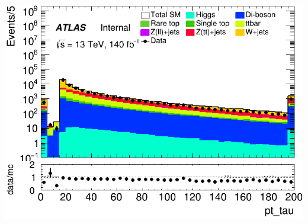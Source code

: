 \documentclass[usenames,dvipsnames]{beamer}
\begin{document}
\begin{frame}
\begin{minipage}{0.32\textwidth}
        \includegraphics[width=\textwidth]{graphics/LH_met/LH_met_pt_tau.png}
    \end{minipage}
    
    \vspace{0.5cm} %
\end{frame}
\end{document}
